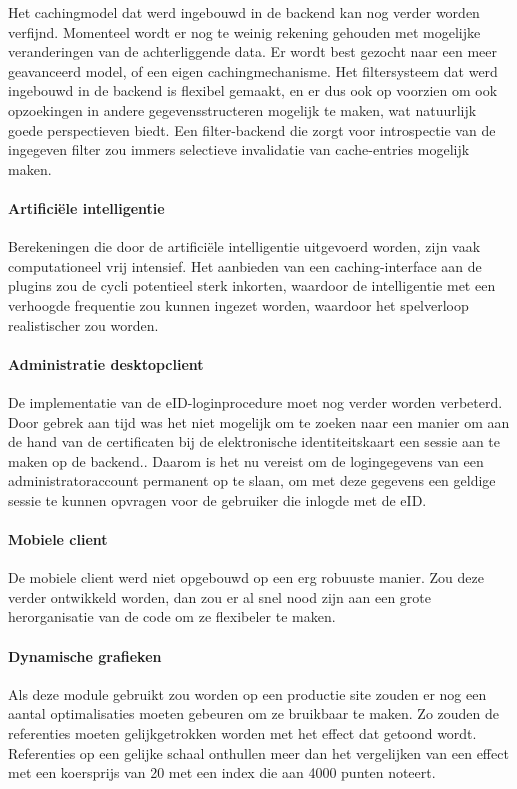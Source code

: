 Het cachingmodel dat werd ingebouwd in de backend kan nog verder worden verfijnd. Momenteel wordt er nog te weinig rekening gehouden met mogelijke veranderingen van de achterliggende data. Er wordt best gezocht naar een meer geavanceerd model, of een eigen cachingmechanisme. Het filtersysteem dat werd ingebouwd in de backend is flexibel gemaakt, en er dus ook op voorzien om ook opzoekingen in andere gegevensstructeren mogelijk te maken, wat natuurlijk goede perspectieven biedt. Een filter-backend die zorgt voor introspectie van de ingegeven filter zou immers selectieve invalidatie van cache-entries mogelijk maken.

\paragraph{Artifici\"ele intelligentie}

Berekeningen die door de artifici\"ele intelligentie uitgevoerd worden, zijn vaak computationeel vrij intensief. Het aanbieden van een caching-interface aan de plugins zou de cycli potentieel sterk inkorten, waardoor de intelligentie met een verhoogde frequentie zou kunnen ingezet worden, waardoor het spelverloop realistischer zou worden.

\paragraph{Administratie desktopclient} De implementatie van de eID-loginprocedure moet nog verder worden verbeterd.  Door gebrek aan tijd was het niet mogelijk om te zoeken naar een manier om aan de hand van de certificaten bij de elektronische identiteitskaart een sessie aan te maken op de backend.. Daarom is het nu vereist om de logingegevens van een administratoraccount permanent op te slaan, om met deze gegevens een geldige sessie te kunnen opvragen voor de gebruiker die inlogde met de eID.

\paragraph{Mobiele client} De mobiele client werd niet opgebouwd op een erg robuuste manier. Zou deze verder ontwikkeld worden, dan zou er al snel nood zijn aan een grote herorganisatie van de code om ze flexibeler te maken.

\paragraph{Dynamische grafieken} Als deze module gebruikt zou worden op een productie site zouden er nog een aantal optimalisaties moeten gebeuren om ze bruikbaar te maken. Zo zouden de referenties moeten gelijkgetrokken worden met het effect dat getoond wordt. Referenties op een gelijke schaal onthullen meer dan het vergelijken van een effect met een koersprijs van 20 met een index die aan 4000 punten noteert.

